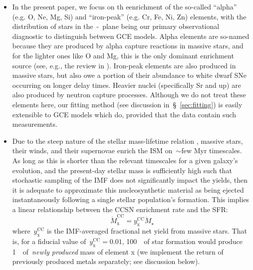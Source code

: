 \documentclass[ms.tex]{subfiles}
\begin{document}
\begin{itemize}

	\item In the present paper, we focus on th eenrichment of the so-called
	``alpha'' (e.g. O, Ne, Mg, Si) and ``iron-peak'' (e.g. Cr, Fe, Ni, Zn)
	elements, with the distribution of stars in the~\afe-\feh~plane being our
	primary observational diagnostic to distinguish between GCE models.
	Alpha elements are so-named because they are produced by alpha capture
	reactions in massive stars, and for the lighter ones like O and Mg, this
	is the only dominant enrichment source (see, e.g., the review in
	\citealp{Johnson2019}).
	Iron-peak elements are also produced in massive stars, but also owe a
	portion of their abundance to white dwarf SNe occurring on longer delay
	times.
	Heavier nuclei (specifically Sr and up) are also produced by neutron
	capture processes.
	Although we do not treat these elements here, our fitting method (see
	discussion in~\S~\ref{sec:fitting}) is easily extensible to GCE models
	which do, provided that the data contain such measurements.

	\item Due to the steep nature of the stellar mass-lifetime relation
	\citep[e.g.][]{Larson1974, Maeder1989, Hurley2000}, massive stars, their
	winds, and their supernovae enrich the ISM on~$\sim$few Myr timescales.
	As long as this is shorter than the relevant timescales for a given
	galaxy's evolution, and the present-day stellar mass is sufficiently high
	such that stochastic sampling of the IMF does not significantly impact the
	yields, then it is adequate to approximate this nucleosynthetic material as
	being ejected instantaneously following a single stellar population's
	formation.
	This implies a linear relationship between the CCSN enrichment rate and
	the SFR:
	\begin{equation}
	\label{eq:mdot_cc}
	\dot{M}_\text{x}^\text{CC} = y_\text{x}^\text{CC}\dot{M}_\star
	\end{equation}
	where~$y_\text{x}^\text{CC}$ is the IMF-averaged fractional net yield from
	massive stars.
	That is, for a fiducial value of~$y_\text{x}^\text{CC} = 0.01$, 100~\msun~of
	star formation would produce 1~\msun~of~\textit{newly produced} mass of
	element x (we implement the return of previously produced metals separately;
	see discussion below).



\end{itemize}
\end{document}
